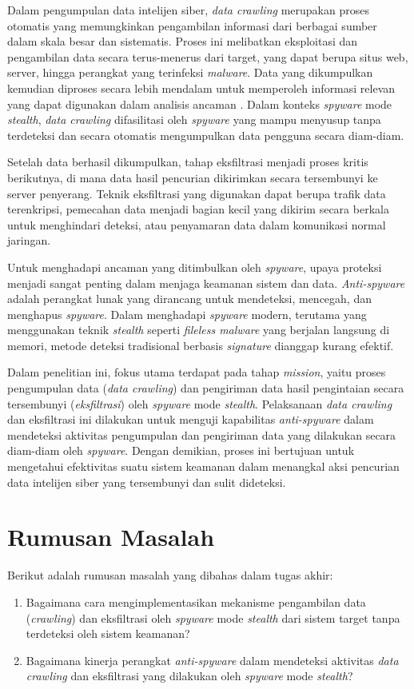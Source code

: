 Dalam pengumpulan data intelijen siber, \textit{data crawling} merupakan proses otomatis yang memungkinkan pengambilan informasi dari berbagai sumber dalam skala besar dan sistematis. Proses ini melibatkan eksploitasi dan pengambilan data secara terus-menerus dari target, yang dapat berupa situs web, server, hingga perangkat yang terinfeksi \textit{malware}. Data yang dikumpulkan kemudian diproses secara lebih mendalam untuk memperoleh informasi relevan yang dapat digunakan dalam analisis ancaman \autocite{verma2021informationgathering}. Dalam konteks \textit{spyware} mode \textit{stealth}, \textit{data crawling} difasilitasi oleh \textit{spyware} yang mampu menyusup tanpa terdeteksi dan secara otomatis mengumpulkan data pengguna secara diam-diam.

Setelah data berhasil dikumpulkan, tahap eksfiltrasi menjadi proses kritis berikutnya, di mana data hasil pencurian dikirimkan secara tersembunyi ke server penyerang. Teknik eksfiltrasi yang digunakan dapat berupa trafik data terenkripsi, pemecahan data menjadi bagian kecil yang dikirim secara berkala untuk menghindari deteksi, atau penyamaran data dalam komunikasi normal jaringan.

Untuk menghadapi ancaman yang ditimbulkan oleh \textit{spyware}, upaya proteksi menjadi sangat penting dalam menjaga keamanan sistem dan data. \textit{Anti-spyware} adalah perangkat lunak yang dirancang untuk mendeteksi, mencegah, dan menghapus \textit{spyware}. Dalam menghadapi \textit{spyware} modern, terutama yang menggunakan teknik \textit{stealth} seperti \textit{fileless malware} yang berjalan langsung di memori, metode deteksi tradisional berbasis \textit{signature} dianggap kurang efektif.

Dalam penelitian ini, fokus utama terdapat pada tahap \textit{mission}, yaitu proses pengumpulan data (\textit{data crawling}) dan pengiriman data hasil pengintaian secara tersembunyi (\textit{eksfiltrasi}) oleh \textit{spyware} mode \textit{stealth}. Pelaksanaan \textit{data crawling} dan eksfiltrasi ini dilakukan untuk menguji kapabilitas \textit{anti-spyware} dalam mendeteksi aktivitas pengumpulan dan pengiriman data yang dilakukan secara diam-diam oleh \textit{spyware}. Dengan demikian, proses ini bertujuan untuk mengetahui efektivitas suatu sistem keamanan dalam menangkal aksi pencurian data intelijen siber yang tersembunyi dan sulit dideteksi.

\section{Rumusan Masalah}
Berikut adalah rumusan masalah yang dibahas dalam tugas akhir: 
\begin{enumerate}
\item	Bagaimana cara mengimplementasikan mekanisme pengambilan data (\textit{crawling}) dan eksfiltrasi oleh \textit{spyware} mode \textit{stealth} dari sistem target tanpa terdeteksi oleh sistem keamanan?
\item	Bagaimana kinerja perangkat \textit{anti-spyware} dalam mendeteksi aktivitas \textit{data crawling} dan eksfiltrasi yang dilakukan oleh \textit{spyware} mode \textit{stealth}?
\end{enumerate}


